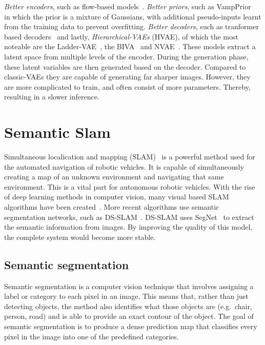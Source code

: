 \emph{Better encoders}, such as flow-based models~\cite{Berg2018SylvesterNF,tomczak2017improving,rezende2015variational}. \emph{Better priors}, such as VampPrior~\cite{tomczak2018vae} in which the prior is a mixture of Gaussians, with additional pseudo-inputs learnt from the training data to prevent overfitting. \emph{Better decoders}, such as tranformer based decoders~\cite{Henderson2022AVA,9054554} and lastly, \emph{Hierarchical-VAEs} (HVAE), of which the most noteable are the Ladder-VAE~\cite{NIPS2016_6ae07dcb}, the BIVA~\cite{maaloe2019biva} and NVAE~\cite{vahdat2020nvae}. These models extract a latent space from multiple levels of the encoder. During the generation phase, these latent variables are then generated based on the decoder. Compared to classic-VAEs they are capable of generating far sharper images. However, they are more complicated to train, and often consist of more parameters. Thereby, resulting in a slower inference.


\section{Semantic Slam}
Simultaneous localication and mapping (SLAM)~\cite{chatila1985position} is a powerful method used for the automated navigation of robotic vehicles. It is capable of simultaneously creating a map of an unknown environment and navigating that same environment. This is a vital part for autonomous robotic vehicles. With the rise of deep learning methods in computer vision, many visual based SLAM algorithms have been created~\cite{taketomi2017visual}. More recent algorithms use semantic segmentation networks, such as DS-SLAM~\cite{yu2018ds}. DS-SLAM uses SegNet~\cite{badri2017segnet} to extract the semantic information from images. By improving the quality of this model, the complete system would become more stable.

\subsection{Semantic segmentation}
Semantic segmentation is a computer vision technique that involves assigning a label or category to each pixel in an image. This means that, rather than just detecting objects, the method also identifies what those objects are (e.g.\, chair, person, road) and is able to provide an exact contour of the object. The goal of semantic segmentation is to produce a dense prediction map that classifies every pixel in the image into one of the predefined categories.

